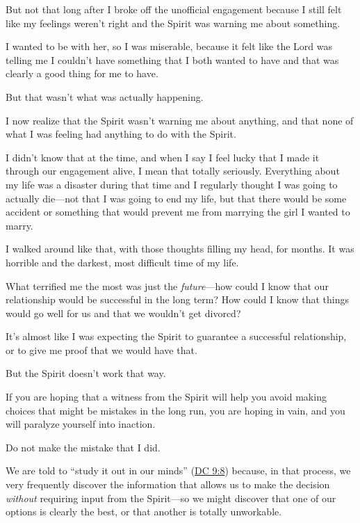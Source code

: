 \begin{compactitem}
\begin{compactitem}
\begin{compactitem}
							\item But not that long after I broke off the unofficial engagement because I still felt like my feelings weren't right and the Spirit was warning me about something.
							\item I wanted to be with her, so I was miserable, because it felt like the Lord was telling me I couldn't have something that I both wanted to have and that was clearly a good thing for me to have.
							\item But that wasn't what was actually happening.
							\item I now realize that the Spirit wasn't warning me about anything, and that none of what I was feeling had anything to do with the Spirit.
							\item I didn't know that at the time, and when I say I feel lucky that I made it through our engagement alive, I mean that totally seriously. Everything about my life was a disaster during that time and I regularly thought I was going to actually die---not that I was going to end my life, but that there would be some accident or something that would prevent me from marrying the girl I wanted to marry.
							\item I walked around like that, with those thoughts filling my head, for months. It was horrible and the darkest, most difficult time of my life.
							\item What terrified me the most was just the \textit{future}---how could I know that our relationship would be successful in the long term? How could I know that things would go well for us and that we wouldn't get divorcd?
							\item It's almost like I was expecting the Spirit to guarantee a successful relationship, or to give me proof that we would have that.
							\item But the Spirit doesn't work that way.
							\item If you are hoping that a witness from the Spirit will help you avoid making choices that might be mistakes in the long run, you are hoping in vain, and you will paralyze yourself into inaction.
							\item Do not make the mistake that I did.
							\item We are told to ``study it out in our minds'' (\hyperref[DC9-8]{DC 9:8}) because, in that process, we very frequently discover the information that allows us to make the decision \textit{without} requiring input from the Spirit---so we might discover that one of our options is clearly the best, or that another is totally unworkable.

\end{compactitem}
\end{compactitem}
\end{compactitem}
